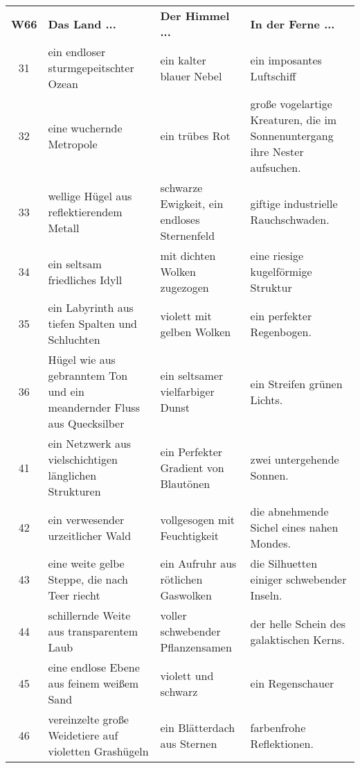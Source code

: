 \documentclass[11pt]{wbzine}
\begin{document}
\begin{tabularx}{\columnwidth}{cZZZ}
\textbf{W66} & \textbf{Das Land ...} & \textbf{Der Himmel ...} &
\textbf{In der Ferne ...} \\
31 & ein endloser sturmgepeitschter Ozean & ein kalter blauer Nebel
& ein imposantes Luftschiff \\
32 & eine wuchernde Metropole & ein trübes Rot & große vogelartige
Kreaturen, die im Sonnenuntergang ihre Nester aufsuchen. \\
33 & wellige Hügel aus reflektierendem Metall &
schwarze Ewigkeit, ein endloses Sternenfeld & giftige
industrielle Rauchschwaden. \\
34 & ein seltsam friedliches Idyll & mit dichten Wolken zugezogen &
eine riesige kugelförmige Struktur \\
35 & ein Labyrinth aus tiefen Spalten und Schluchten & violett mit
gelben Wolken & ein perfekter Regenbogen. \\
36 & Hügel wie aus gebranntem Ton und ein meandernder Fluss aus
Quecksilber & ein seltsamer vielfarbiger Dunst & ein Streifen grünen
Lichts. \\
41 & ein Netzwerk aus vielschichtigen länglichen Strukturen  & ein
Perfekter Gradient von Blautönen & zwei untergehende Sonnen. \\
42 & ein verwesender urzeitlicher Wald & vollgesogen mit
Feuchtigkeit & die abnehmende Sichel eines nahen Mondes. \\
43 & eine weite gelbe Steppe, die nach Teer riecht & ein Aufruhr aus
rötlichen Gaswolken & die Silhuetten einiger schwebender Inseln. \\
44 & schillernde Weite aus transparentem Laub & voller schwebender
Pflanzensamen & der helle Schein des galaktischen Kerns. \\
45 & eine endlose Ebene aus feinem weißem Sand & violett und schwarz
& ein Regenschauer \\
46 & vereinzelte große Weidetiere auf violetten Grashügeln & ein
Blätterdach aus Sternen & farbenfrohe Reflektionen. \\
\end{tabularx}
\end{document}
